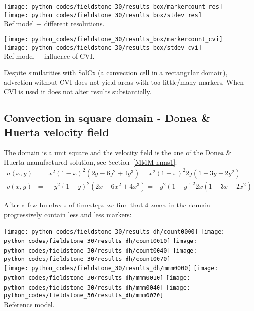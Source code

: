 \begin{center}
\texttt{[image: python\_codes/fieldstone\_30/results\_box/markercount\_res]}
\texttt{[image: python\_codes/fieldstone\_30/results\_box/stdev\_res]}\\
{\captionfont Ref model + different resolutions.}
\end{center}

\begin{center}
\texttt{[image: python\_codes/fieldstone\_30/results\_box/markercount\_cvi]}
\texttt{[image: python\_codes/fieldstone\_30/results\_box/stdev\_cvi]}\\
{\captionfont Ref model + influence of CVI.}
\end{center}

Despite similarities with SolCx (a convection cell in a rectangular domain),
advection without CVI does not yield areas with too little/many markers.
When CVI is used it does not alter results substantially.


\newpage
\subsection*{Convection in square domain - Donea \& Huerta velocity field}

The domain is a unit square and the velocity field is the one of the 
Donea \& Huerta manufactured solution, see Section~\ref{MMM-mms1}:
\begin{eqnarray}
u(x,y) &=& x^2(1- x)^2 (2y - 6y^2 + 4y^3) = x^2(1-x)^2 2y (1-3y+2y^2) \nonumber\\
v(x,y) &=& -y^2 (1 - y)^2 (2x - 6x^2 + 4x^3) = -y^2 (1 - y)^2 2x (1-3x+2x^2) 
\end{eqnarray}

After a few hundreds of timesteps we find that 4 zones in the domain 
progressively contain less and less markers:

\begin{center}
\texttt{[image: python\_codes/fieldstone\_30/results\_dh/count0000]}
\texttt{[image: python\_codes/fieldstone\_30/results\_dh/count0010]}
\texttt{[image: python\_codes/fieldstone\_30/results\_dh/count0040]}
\texttt{[image: python\_codes/fieldstone\_30/results\_dh/count0070]}\\
\texttt{[image: python\_codes/fieldstone\_30/results\_dh/mmm0000]}
\texttt{[image: python\_codes/fieldstone\_30/results\_dh/mmm0010]}
\texttt{[image: python\_codes/fieldstone\_30/results\_dh/mmm0040]}
\texttt{[image: python\_codes/fieldstone\_30/results\_dh/mmm0070]}\\
{\captionfont Reference model.}
\end{center}

